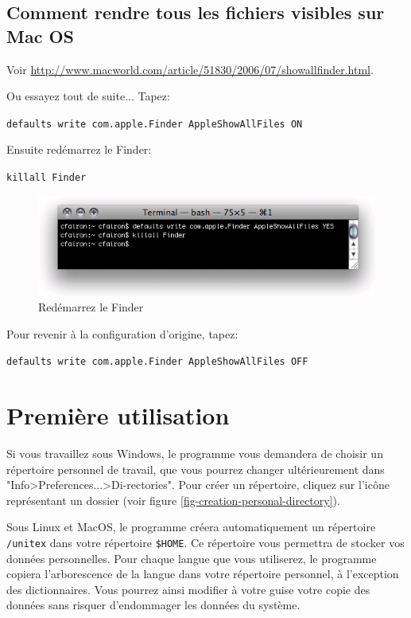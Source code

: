 \subsection{Comment rendre tous les fichiers visibles sur Mac OS}
\noindent Voir
\url{http://www.macworld.com/article/51830/2006/07/showallfinder.html}.

\bigskip
\noindent Ou essayez tout de suite... Tapez: 

\bigskip
\verb+defaults write com.apple.Finder AppleShowAllFiles ON+

\bigskip
\noindent Ensuite redémarrez le Finder:

\bigskip
\verb+killall Finder+

\begin{figure}[!h]
\begin{center}
\includegraphics[width=12cm]{resources/img/fig-mac6.png}
\caption{Redémarrez le Finder\label{fig-mac6}}
\end{center}
\end{figure}

\bigskip
\noindent Pour revenir à la configuration d'origine, tapez: 

\bigskip
\verb+defaults write com.apple.Finder AppleShowAllFiles OFF+


\section{Première utilisation}
Si vous travaillez sous Windows, le programme vous demandera de choisir un répertoire personnel
 de travail, que vous pourrez changer ultérieurement dans
"Info>Preferences...>Di-rectories". Pour créer un répertoire, cliquez sur l’icône représentant un
dossier (voir figure \ref{fig-creation-personal-directory}).

\bigskip
\noindent Sous Linux et MacOS, le programme créera automatiquement un répertoire
\verb+/unitex+ dans votre répertoire \verb+$HOME+. Ce répertoire vous permettra de stocker vos
données personnelles. 
Pour chaque langue que vous utiliserez, le programme copiera l’arborescence de la langue dans votre
répertoire personnel,
à l’exception des dictionnaires. Vous pourrez ainsi modifier à votre guise votre copie des données
sans risquer d’endommager les données du système.



